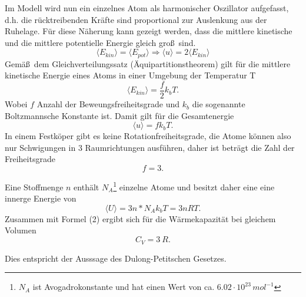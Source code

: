 \documentclass[11pt,ngerman,a4paper]{article}
\begin{document}
\noindent
Im Modell wird nun ein einzelnes Atom als harmonischer Oszillator aufgefasst, d.h. die r\"ucktreibenden Kr\"afte sind proportional zur Auslenkung aus der Ruhelage. F\"ur diese N\"aherung kann gezeigt werden, dass die mittlere kinetische und die mittlere potentielle Energie gleich gro\ss\ sind. 
\begin{equation}
\langle E_{kin} \rangle=\langle E_{pot} \rangle \Rightarrow \langle u \rangle = 2 \langle   E_{kin} \rangle
\end{equation}
Gem\"a\ss\ dem Gleichverteilungssatz (\"Aquipartitionstheorem) gilt f\"ur die mittlere kinetische Energie eines Atoms in einer Umgebung der Temperatur T
\begin{equation}
\langle E_{kin} \rangle = \frac{f}{2}k_b T.
\end{equation}
Wobei $f$ Anzahl der Beweungsfreiheitsgrade und $k_b$ die sogenannte Boltzmannsche Konstante ist. Damit gilt f\"ur die Gesamtenergie 
\begin{equation}
\langle u \rangle = f k_b T.
\end{equation}
In einem Festk\"oper gibt es keine Rotationfreiheitsgrade, die Atome k\"onnen also nur Schwigungen in 3 Raumrichtungen ausf\"uhren, daher ist betr\"agt die Zahl der Freiheitsgrade
\[f =3.\]

\noindent
Eine Stoffmenge $n$ enth\"alt $N_A$\footnote{$N_A$ ist Avogadrokonstante und hat einen Wert von ca. $6.02\cdot 10^{23}\,mol^{-1}$} einzelne Atome und besitzt daher eine eine innerge Energie von 
\begin{equation}
\langle U \rangle = 3 n* N_A k_b T = 3 n R T .
\end{equation}
Zusammen mit Formel (2) ergibt sich f\"ur die W\"armekapazit\"at bei gleichem Volumen
\begin{equation}
C_V= 3\ R.
\end{equation}

\noindent
Dies entspricht der Ausssage des Dulong-Petitschen Gesetzes.
\end{document}
